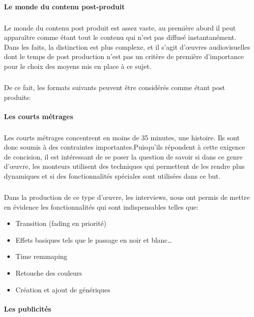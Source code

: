 \paragraph{Le monde du contenu post-produit}

\subparagraph{}

Le monde du contenu post produit est assez vaste, au première abord il peut apparaître comme étant tout le contenu
qui n'est pas diffusé instantanément. Dans les faits, la distinction est plus complexe, et il s'agit
d'œuvres audiovisuelles dont le temps de post production n'est pas un critère de première d'importance
pour le choix des moyens mis en place à ce sujet.

\subparagraph{}

De ce fait, les formats suivants peuvent être considérés comme étant post produits:

\paragraph{Les courts métrages}

\subparagraph{}

Les courts métrages concentrent en moins de 35 minutes, une histoire. Ils sont donc soumis
à des contraintes importantes.Puisqu'ils répondent à cette exigence de concision,
il est intéressant de se poser la question de savoir si dans ce genre
d'œuvre, les monteurs utilisent des techniques qui permettent
de les rendre plus dynamiques et si des fonctionnalités spéciales sont utilisées dans
ce but.

\subparagraph{}

Dans la production de ce type d'œuvre, les interviews, nous ont permis de mettre en évidence
les fonctionnalités qui sont indispensables telles que:
\begin{itemize} \setlength{\itemsep}{2mm}
  \item{Transition (fading en priorité)}
  \item{Effets basiques tels que le passage en noir et blanc\ldots}
  \item{Time remmaping}
  \item{Retouche des couleurs}
  \item{Création et ajout de génériques}
\end{itemize}

\paragraph {Les publicités}

